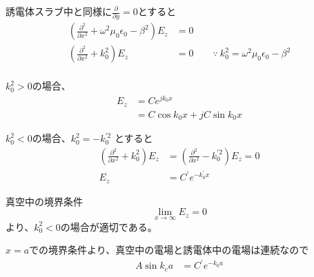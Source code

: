 \documentclass[a4paper,10pt]{bxjsarticle}
\begin{document}
誘電体スラブ中と同様に$\frac{\partial}{\partial y} = 0$とすると
\begin{align*}
    \left( 
        \frac{\partial^2}{\partial x^2} 
        + \omega^2 \mu_0 \epsilon_0 - \beta^2 
    \right) E_z
    & = 0 \\
    \left( 
        \frac{\partial^2}{\partial x^2} 
        + k_0^2
    \right) E_z
    & = 0 \qquad
    \because \ k_0^2 = \omega^2 \mu_0 \epsilon_0 - \beta^2 \\
\end{align*}

$k_0^2 > 0$の場合、
\begin{align*}
    E_z &= C e^{j k_0 x} \\
        &= C \cos k_0 x + j C \sin k_0 x
\end{align*}

$k_0^2 < 0$の場合、$k_0^2 = - k_0^{\prime 2}$ とすると
\begin{align*}
    \left( 
        \frac{\partial^2}{\partial x^2} 
        + k_0^2
    \right) E_z
    & =
    \left( 
        \frac{\partial^2}{\partial x^2} 
        - k_0^{\prime 2}
    \right) E_z
    = 0 \\
    E_z &= C^\prime e^{- k_0^\prime x}
\end{align*}

真空中の境界条件 
$$\lim_{x \to \infty} E_z = 0$$
より、$k_0^2 < 0$の場合が適切である。

$x=a$での境界条件より、真空中の電場と誘電体中の電場は連続なので
\begin{align*}
    A \sin k_c a & = C^\prime e^{- k_0 a} \\
\end{align*}




  
\end{document}
